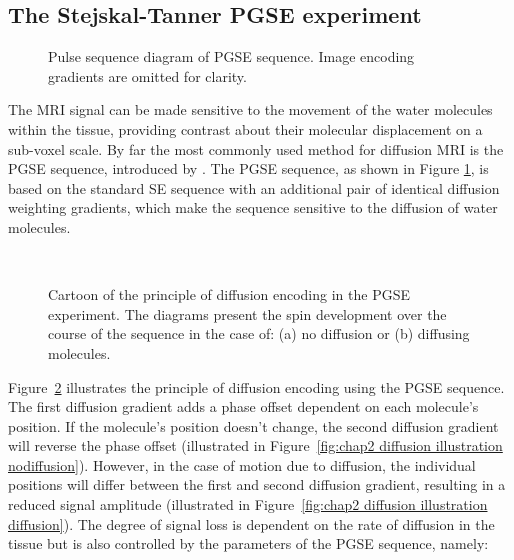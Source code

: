 \subsection{The Stejskal-Tanner PGSE experiment}
\begin{figure}[ht]
\centering
{}
\caption{Pulse sequence diagram of PGSE sequence. Image encoding gradients are omitted for clarity.}
\label{fig:chapter2 pgse_diagram}
\end{figure}

The MRI signal can be made sensitive to the movement of the water molecules within the tissue, providing contrast about their molecular displacement on a sub-voxel scale. By far the most commonly used method for diffusion MRI is the {\gls{PGSE}} sequence, introduced by \citet{Stejskal:1965}. The {\gls{PGSE}} sequence, as shown in Figure \ref{fig:chapter2 pgse_diagram}, is based on the standard SE sequence with an additional pair of identical diffusion weighting gradients, which make the sequence sensitive to the diffusion of water molecules. 


\begin{figure}[phtb]
\centering
{}\\
\caption{Cartoon of the principle of diffusion encoding in the PGSE experiment. The diagrams present the spin development over the course of the sequence in the case of: (a) no diffusion or (b) diffusing molecules.}
\label{fig:chap2 diffusion illustration}
\end{figure}


Figure~\ref{fig:chap2 diffusion illustration} illustrates the principle of diffusion encoding using the PGSE sequence. The first diffusion gradient adds a phase offset dependent on each molecule's position. If the molecule's position doesn't change, the second diffusion gradient will reverse the phase offset (illustrated in Figure~\ref{fig:chap2 diffusion illustration nodiffusion}). However, in the case of motion due to diffusion, the individual positions will differ between the first and second diffusion gradient, resulting in a reduced signal amplitude	(illustrated in Figure~\ref{fig:chap2 diffusion illustration diffusion}). The degree of signal loss is dependent on the rate of diffusion in the tissue but is also controlled by the parameters of the {\gls{PGSE}} sequence, namely:

